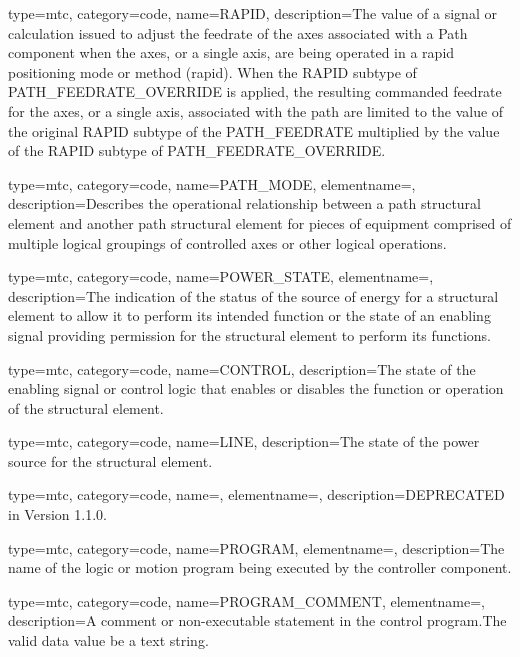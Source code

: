 {
  type=mtc,
  category=code,
  name={RAPID},
  description={The value of a signal or calculation issued to adjust the feedrate of the axes associated with a Path component when the axes, or a single axis, are being operated in a rapid positioning mode or method (rapid).   \newline When the RAPID subtype of PATH\_FEEDRATE\_OVERRIDE is applied, the resulting commanded feedrate for the axes, or a single axis, associated with the path are limited to the value of the original RAPID subtype of the PATH\_FEEDRATE multiplied by the value of the RAPID subtype of PATH\_FEEDRATE\_OVERRIDE.}
}

{
  type=mtc,
  category=code,
  name={PATH\_MODE},
  elementname=,
  description={Describes the operational relationship between a \gls{path} \gls{structural element} and another \gls{path} \gls{structural element} for pieces of equipment comprised of multiple logical groupings of controlled axes or other logical operations.}
}

{
  type=mtc,
  category=code,
  name={POWER\_STATE},
  elementname=,
  description={The indication of the status of the source of energy for a \gls{structural element} to allow it to perform its intended function or the state of an enabling signal providing permission for the \gls{structural element} to perform its functions.}
}

{
  type=mtc,
  category=code,
  name={CONTROL},
  description={The state of the enabling signal or control logic that enables or disables the function or operation of the \gls{structural element}.}
}

{
  type=mtc,
  category=code,
  name={LINE},
  description={The state of the power source for the \gls{structural element}.}
}

{
  type=mtc,
  category=code,
  name=,
  elementname=,
  description={DEPRECATED in Version 1.1.0.}
}

{
  type=mtc,
  category=code,
  name={PROGRAM},
  elementname=,
  description={The name of the logic or motion program being executed by the \gls{controller} component.}
}

{
  type=mtc,
  category=code,
  name={PROGRAM\_COMMENT},
  elementname=,
  description={A comment or non-executable statement in the control program.The \gls{valid data value} \must be a text string.}
}


